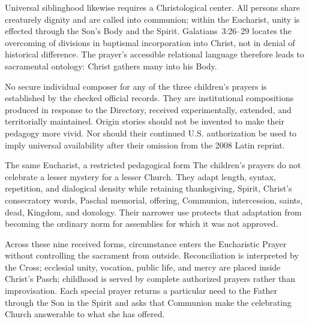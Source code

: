 Universal siblinghood likewise requires a Christological center. All persons share creaturely dignity and are called into communion; within the Eucharist, unity is effected through the Son's Body and the Spirit. Galatians~3:26--29 locates the overcoming of divisions in baptismal incorporation into Christ, not in denial of historical difference. The prayer's accessible relational language therefore leads to sacramental ontology: Christ gathers many into his Body.

No secure individual composer for any of the three children's prayers is established by the checked official records. They are institutional compositions produced in response to the Directory, received experimentally, extended, and territorially maintained. Origin stories should not be invented to make their pedagogy more vivid. Nor should their continued U.S. authorization be used to imply universal availability after their omission from the 2008 Latin reprint.

\begin{massbox}{The same Eucharist, a restricted pedagogical form}
The children's prayers do not celebrate a lesser mystery for a lesser Church. They adapt length, syntax, repetition, and dialogical density while retaining thanksgiving, Spirit, Christ's consecratory words, Paschal memorial, offering, Communion, intercession, saints, dead, Kingdom, and doxology. Their narrower use protects that adaptation from becoming the ordinary norm for assemblies for which it was not approved.
\end{massbox}

Across these nine received forms, circumstance enters the Eucharistic Prayer without controlling the sacrament from outside. Reconciliation is interpreted by the Cross; ecclesial unity, vocation, public life, and mercy are placed inside Christ's Pasch; childhood is served by complete authorized prayers rather than improvisation. Each special prayer returns a particular need to the Father through the Son in the Spirit and asks that Communion make the celebrating Church answerable to what she has offered.
